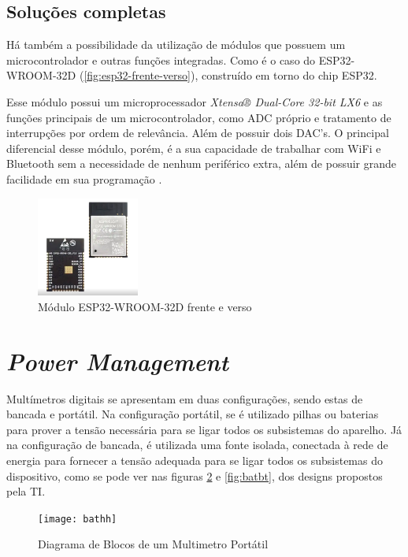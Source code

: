 \subsection{Soluções completas}\label{subsec:solucomp}

Há também a possibilidade da utilização de módulos que possuem um microcontrolador e outras funções integradas. Como é o caso do ESP32-WROOM-32D (\autoref{fig:esp32-frente-verso}), construído em torno do chip ESP32.

Esse módulo possui um microprocessador \textit{Xtensa® Dual-Core 32-bit LX6} e as funções principais de um microcontrolador, como \gls{ADC} próprio e tratamento de interrupções por ordem de relevância. Além de possuir dois \gls{DAC}'s. O principal diferencial desse módulo, porém, é a sua capacidade de trabalhar com WiFi e Bluetooth sem a necessidade de nenhum periférico extra, além de possuir grande facilidade em sua programação \cite{esp32-datasheet}.

\begin{figure}[htb!]
    \caption{Módulo ESP32-WROOM-32D frente e verso}
    \label{fig:esp32-frente-verso}
    \includegraphics[width=0.3\textwidth]{figuras/esp32-frente-verso.png}
\end{figure}

\section{\textit{Power Management}}\label{powerManagement}

Multímetros digitais se apresentam em duas configurações, sendo estas de bancada e portátil. Na configuração portátil, se é utilizado pilhas ou baterias para prover a tensão necessária para se ligar todos os subsistemas do aparelho. Já na configuração de bancada, é utilizada uma fonte isolada, conectada à rede de energia para fornecer a tensão adequada para se ligar todos os subsistemas do dispositivo, como se pode ver nas figuras \ref{fig:bathh} e \ref{fig:batbt}, dos designs propostos pela \gls{TI}.

\begin{figure}[htb!]%
    \caption{Diagrama de Blocos de um Multimetro Portátil}%
    \label{fig:bathh}%
    \texttt{[image: bathh]}%
\end{figure}

